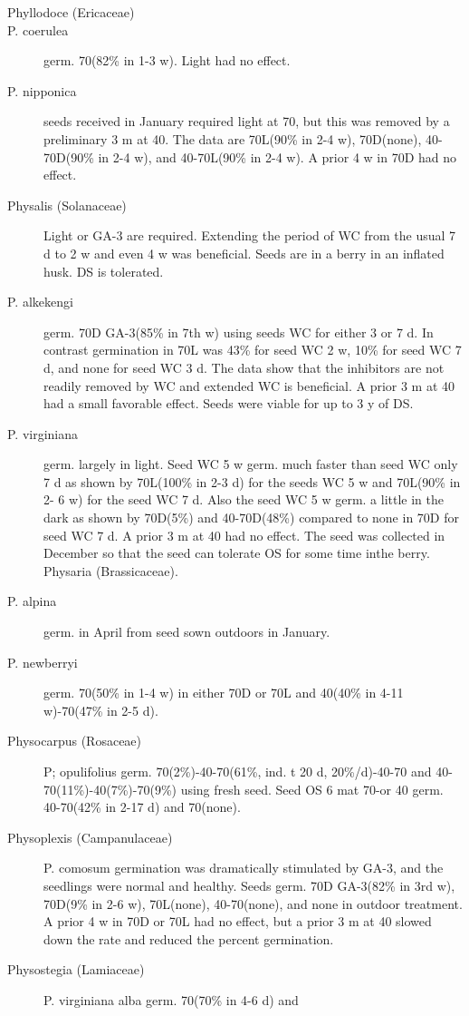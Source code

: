 \begin{description}
\item[Phyllodoce (Ericaceae)]
\item[P. coerulea] germ. 70(82\% in 1-3 w). Light had no effect.
\item[P. nipponica] seeds received in January required light at 70, but this was
removed by a preliminary 3 m at 40. The data are 70L(90\% in 2-4 w), 70D(none), 40-
70D(90\% in 2-4 w), and 40-70L(90\% in 2-4 w). A prior 4 w in 70D had no effect.
\item[Physalis (Solanaceae)] Light or GA-3 are required. Extending the period of
WC from the usual 7 d to 2 w and even 4 w was beneficial. Seeds are in a berry in an
inflated husk. DS is tolerated.

\item[P. alkekengi] germ. 70D GA-3(85\% in 7th w) using seeds WC for either 3 or 7 d.
In contrast germination in 70L was 43\% for seed WC 2 w, 10\% for seed WC 7 d, and
none for seed WC 3 d. The data show that the inhibitors are not readily removed by
WC and extended WC is beneficial. A prior 3 m at 40 had a small favorable effect.
Seeds were viable for up to 3 y of DS.
\item[P. virginiana] germ. largely in light. Seed WC 5 w germ. much faster than seed
WC only 7 d as shown by 70L(100\% in 2-3 d) for the seeds WC 5 w and 70L(90\% in 2-
6 w) for the seed WC 7 d. Also the seed WC 5 w germ. a little in the dark as shown by
70D(5\%) and 40-70D(48\%) compared to none in 70D for seed WC 7 d. A prior 3 m at
40 had no effect. The seed was collected in December so that the seed can tolerate
OS for some time inthe berry.
Physaria (Brassicaceae).
\item[P. alpina] germ. in April from seed sown outdoors in January.
\item[P. newberryi] germ. 70(50\% in 1-4 w) in either 70D or 70L and 40(40\% in 4-11
w)-70(47\% in 2-5 d).
\item[Physocarpus (Rosaceae)] P; opulifolius germ. 70(2\%)-40-70(61\%, ind. t 20
d, 20\%/d)-40-70 and 40-70(11\%)-40(7\%)-70(9\%) using fresh seed. Seed OS 6 mat
70-or 40 germ. 40-70(42\% in 2-17 d) and 70(none).
\item[Physoplexis (Campanulaceae)] P. comosum germination was
dramatically stimulated by GA-3, and the seedlings were normal and healthy. Seeds
germ. 70D GA-3(82\% in 3rd w), 70D(9\% in 2-6 w), 70L(none), 40-70(none), and none
in outdoor treatment. A prior 4 w in 70D or 70L had no effect, but a prior 3 m at 40
slowed down the rate and reduced the percent germination.
\item[Physostegia (Lamiaceae)] P. virginiana alba germ. 70(70\% in 4-6 d) and

\end{description}
